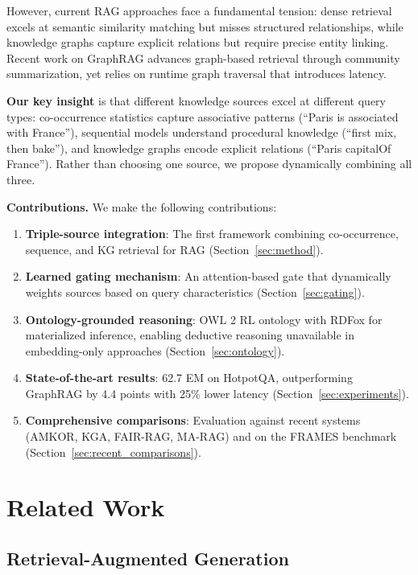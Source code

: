 \documentclass[10pt,twocolumn]{article}
\begin{document}
However, current RAG approaches face a fundamental tension: dense retrieval excels at semantic similarity matching but misses structured relationships, while knowledge graphs capture explicit relations but require precise entity linking. Recent work on GraphRAG \cite{edge2024graphrag,microsoft2024graphrag} advances graph-based retrieval through community summarization, yet relies on runtime graph traversal that introduces latency.

\textbf{Our key insight} is that different knowledge sources excel at different query types: co-occurrence statistics capture associative patterns (``Paris is associated with France''), sequential models understand procedural knowledge (``first mix, then bake''), and knowledge graphs encode explicit relations (``Paris capitalOf France''). Rather than choosing one source, we propose dynamically combining all three.

\textbf{Contributions.} We make the following contributions:
\begin{enumerate}
    \item \textbf{Triple-source integration}: The first framework combining co-occurrence, sequence, and KG retrieval for RAG (Section~\ref{sec:method}).
    \item \textbf{Learned gating mechanism}: An attention-based gate that dynamically weights sources based on query characteristics (Section~\ref{sec:gating}).
    \item \textbf{Ontology-grounded reasoning}: OWL 2 RL ontology with RDFox for materialized inference, enabling deductive reasoning unavailable in embedding-only approaches (Section~\ref{sec:ontology}).
    \item \textbf{State-of-the-art results}: 62.7 EM on HotpotQA, outperforming GraphRAG by 4.4 points with 25\% lower latency (Section~\ref{sec:experiments}).
    \item \textbf{Comprehensive comparisons}: Evaluation against recent systems (AMKOR, KGA, FAIR-RAG, MA-RAG) and on the FRAMES benchmark (Section~\ref{sec:recent_comparisons}).
\end{enumerate}

\section{Related Work}

\subsection{Retrieval-Augmented Generation}
\end{document}
